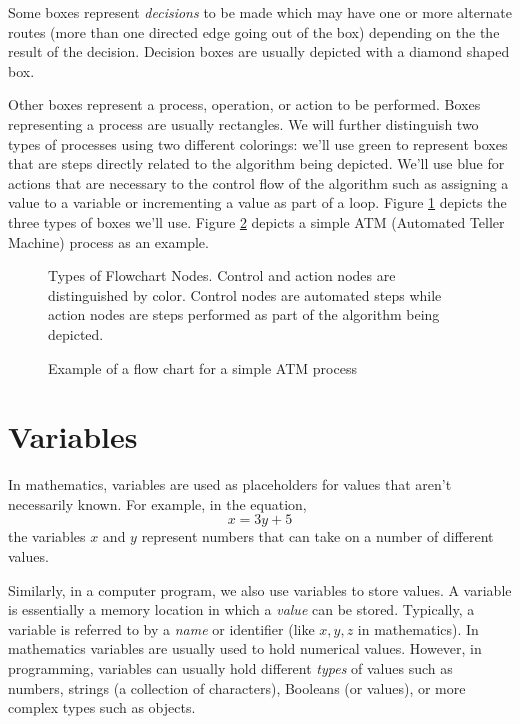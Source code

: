 Some boxes represent \emph{decisions} to be made which may have one or
more alternate routes (more than one directed edge going out of the box)
depending on the the result of the decision.  Decision boxes are usually 
depicted with a diamond shaped box.

Other boxes represent a process, operation, or action to be performed.  Boxes
representing a process are usually rectangles.  We will further distinguish two
types of processes using two different colorings: we'll use green to represent
boxes that are steps directly related to the algorithm being depicted.  We'll
use blue for actions that are necessary to the control flow of the algorithm such
as assigning a value to a variable or incrementing a value as part of a loop.
Figure \ref{figure:flowchartNodes} depicts the three types of boxes we'll use.  
Figure \ref{figure:flowchartATM} depicts a simple ATM (Automated Teller Machine) process 
as an example.

\begin{figure}
\centering
{}
\caption[Types of Flowchart Nodes]{Types of Flowchart Nodes.  Control and 
action nodes are distinguished by color.  Control nodes are automated steps
while action nodes are steps performed as part of the algorithm being depicted.}
\label{figure:flowchartNodes}
\end{figure}

\begin{figure}
\centering

\caption{Example of a flow chart for a simple ATM process}
\label{figure:flowchartATM}
\end{figure}

\section{Variables}

In mathematics, variables are used as placeholders for values that aren't
necessarily known.  For example, in the equation, 
  $$x = 3y + 5$$ 
the variables $x$ and $y$ represent numbers that can take on a number 
of different values.

Similarly, in a computer program, we also use \glspl{variable} to store 
values.  A variable is essentially a memory location in which a \emph{value} 
can be stored.  Typically, a variable is referred to by a \emph{name} 
or \gls{identifier} (like $x, y, z$ in mathematics).  In mathematics variables
are usually used to hold numerical values.  However, in programming, 
variables can usually hold different \emph{types} of values such as numbers,
strings (a collection of characters), Booleans (\True or \False values), or
more complex types such as objects.

